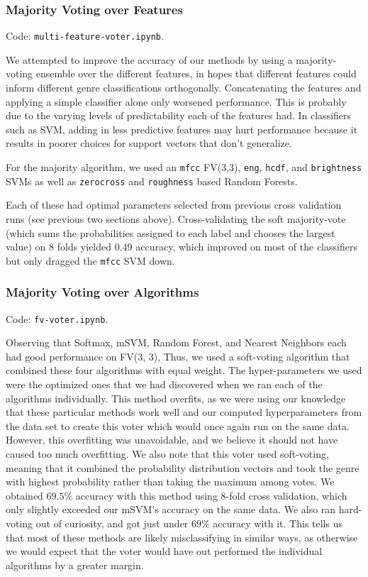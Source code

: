 \documentclass[9pt]{article}
\begin{document}
\subsubsection{Majority Voting over Features}\label{majority-features}

Code: \texttt{multi-feature-voter.ipynb}. 

We attempted to improve the accuracy of our methods by using a majority-voting ensemble over the different features, in hopes that different features could inform different genre classifications orthogonally. Concatenating the features and applying a simple classifier alone only worsened performance. This is probably due to the varying levels of predictability each of the features had. In classifiers such as SVM, adding in less predictive features may hurt performance because it results in poorer choices for support vectors that don't generalize.

For the majority algorithm, we used an \texttt{mfcc} FV(3,3), \texttt{eng}, \texttt{hcdf}, and \texttt{brightness} SVMs as well as \texttt{zerocross} and \texttt{roughness} based Random Forests.

Each of these had optimal parameters selected from previous cross validation runs (see previous two sections above). Cross-validating the soft majority-vote (which sums the probabilities assigned to each label and chooses the largest value) on 8 folds yielded 0.49 accuracy, which improved on most of the classifiers but only dragged the \texttt{mfcc} SVM down. 

\subsubsection{Majority Voting over Algorithms}

Code: \texttt{fv-voter.ipynb}.

Observing that Softmax, mSVM, Random Forest, and Nearest Neighbors
each had good performance on FV(3, 3),
Thus, we used a soft-voting algorithm that combined these four
algorithms with equal weight.
The hyper-parameters we used were the optimized ones that we had
discovered when we ran each of the algorithms individually.
This method overfits,
as we were using our knowledge that these particular methods
work well and our computed hyperparameters from the data set
to create this voter which would once again run on the same data.
However, this overfitting was unavoidable, and we believe
it should not have caused too much overfitting.
We also note that this voter used soft-voting, meaning that
it combined the probability distribution vectors and took
the genre with highest probability rather than taking
the maximum among votes.
We obtained $69.5\%$ accuracy with this method using 8-fold cross validation, 
which only slightly exceeded our mSVM's accuracy on the same data.
We also ran hard-voting out of curiosity, and got just under $69\%$ accuracy with it.
This tells us that most of these methods are likely misclassifying 
in similar ways, as otherwise we would expect that the voter would
have out performed the individual algorithms by a greater margin.
\end{document}
